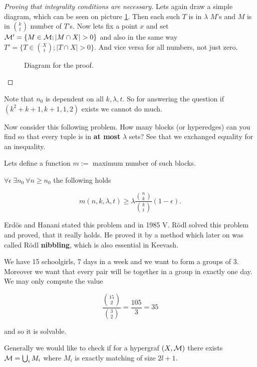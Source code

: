 \begin{proof}[Proving that integrality conditions are necessary]
	Lets again draw a simple diagram, which can be seen on picture \ref{nec-integr-cond}. Then each such $T$ is in $\lambda$ $M$'s and $M$ is in $\binom{k}{t}$ number of $T$'s. Now lets fix a point $x$ and set $\mathcal{M}' = \{M \in \mathcal{M}; |M \cap X| > 0\}$ and also in the same way $T' = \{T \in \binom{X}{t}; |T \cap X| > 0\}$. And vice versa for all numbers, not just zero.
	
	\begin{figure}[!ht]\centering
		\caption{Diagram for the proof.}
		\label{nec-integr-cond}
	\end{figure}
\end{proof}

Note that $n_0$ is dependent on all $k,\lambda,t$. So for answering the question if $(k^2 + k +1, k+1, 1, 2)$ exists we cannot do much.

Now consider this following problem. How many blocks (or hyperedges) can you find so that every tuple is in \textbf{at most} $\lambda$ sets? See that we exchanged equality for an inequality.

\begin{defn}
	Lets define a function $m :=$ maximum number of such blocks.
\end{defn}

\begin{thm}
	$\forall \epsilon \ \exists n_0 \ \forall n \geq n_0$  the following holds
	
	$$
	m(n,k,\lambda,t) \geq \lambda \frac{\binom{n}{k}}{\binom{k}{t}}(1 - \epsilon).
	$$
\end{thm}

Erdös and Hanani stated this problem and in 1985 V. Rödl solved this problem and proved, that it really holds. He proved it by a method which later on was called Rödl \textbf{nibbling}, which is also essential in Keevash.

\begin{example}
	We have 15 schoolgirls, 7 days in a week and we want to form a groups of 3. Moreover we want that every pair will be together in a group in exactly one day. We may only compute the value
	
	$$
	\frac{\binom{15}{2}}{\binom{3}{2}} = \frac{105}{3} = 35
	$$
	
	\noindent and so it is solvable.
\end{example}

Generally we would like to check if for a hypergraf $(X, \mathcal{M})$ there exists $\mathcal{M} = \bigcup_i M_i$ where $M_i$ is exactly matching of size $2l+1$.